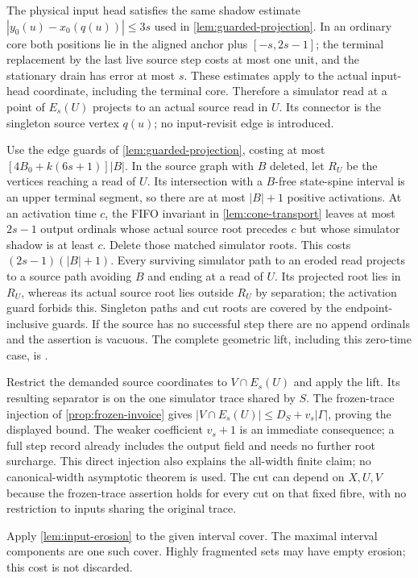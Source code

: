 \begin{outline}
The physical input head satisfies the same shadow estimate
$|y_0(u)-x_0(q(u))|\le3s$ used in \cref{lem:guarded-projection}.
In an ordinary core both positions lie in the aligned anchor plus
$[-s,2s-1]$; the terminal replacement by the last live source step costs
at most one unit, and the stationary drain has error at most $s$.
These estimates apply to the actual input-head coordinate, including the
terminal core. Therefore a simulator read at a point of $E_s(U)$ projects
to an actual source read in $U$. Its connector is the singleton source
vertex $q(u)$; no input-revisit edge is introduced.

Use the edge guards of \cref{lem:guarded-projection}, costing at most
$[4B_0+k(6s+1)]|B|$. In the source graph with $B$ deleted, let $R_U$
be the vertices reaching a read of $U$. Its intersection with a $B$-free
state-spine interval is an upper terminal segment, so there are at most
$|B|+1$ positive activations. At an activation time $c$, the FIFO invariant
in \cref{lem:cone-transport} leaves at most $2s-1$ output ordinals whose
actual source root precedes $c$ but whose simulator shadow is at least $c$.
Delete those matched simulator roots. This costs
$(2s-1)(|B|+1)$. Every surviving simulator path to an eroded read projects
to a source path avoiding $B$ and ending at a read of $U$. Its projected
root lies in $R_U$, whereas its actual source root lies outside $R_U$ by
separation; the activation guard forbids this. Singleton paths and cut
roots are covered by the endpoint-inclusive guards. If the source has no
successful step there are no append ordinals and the assertion is vacuous.
The complete geometric lift, including this zero-time case, is
.

Restrict the demanded source coordinates to $V\cap E_s(U)$ and apply
the lift. Its resulting separator is on the one simulator trace shared
by $S$. The frozen-trace injection of \cref{prop:frozen-invoice} gives
$|V\cap E_s(U)|\le D_S+v_s|\Gamma|$, proving the displayed bound.
The weaker coefficient $v_s+1$ is an immediate consequence; a full step
record already includes the output field and needs no further root surcharge.
This direct injection also explains the all-width finite
claim; no canonical-width asymptotic theorem is used. The cut can depend
on $X,U,V$ because the frozen-trace assertion holds for every cut on that
fixed fibre, with no restriction to inputs sharing the original trace.

Apply \cref{lem:input-erosion} to the given interval cover. The maximal
interval components are one such cover.
Highly fragmented sets may have empty erosion; this cost is not discarded.
\end{outline}

